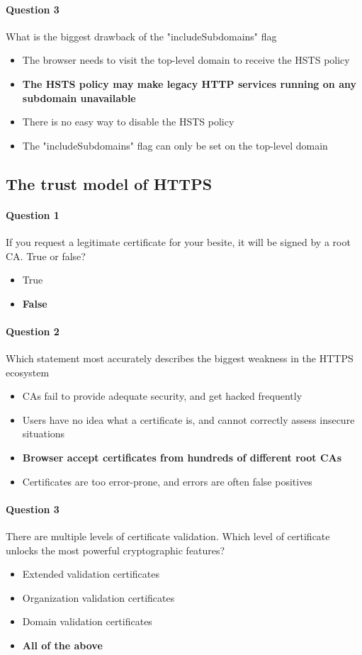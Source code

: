 \documentclass[titlepage]{article}
\begin{document}
    \paragraph{Question 3} What is the biggest drawback of the "includeSubdomains" flag
    \begin{itemize}
        \item The browser needs to visit the top-level domain to receive the HSTS policy
        \item \textbf{The HSTS policy may make legacy HTTP services running on any subdomain unavailable} \checkmark
        \item There is no easy way to disable the HSTS policy
        \item The "includeSubdomains" flag can only be set on the top-level domain
    \end{itemize}
    \subsection{The trust model of HTTPS}
    \paragraph{Question 1} If you request a legitimate certificate for your besite, it will be signed by a root CA. True or false?
    \begin{itemize}
        \item True
        \item \textbf{False} \checkmark
    \end{itemize}
    \paragraph{Question 2} Which statement most accurately describes the biggest weakness in the HTTPS ecosystem
    \begin{itemize}
        \item CAs fail to provide adequate security, and get hacked frequently
        \item Users have no idea what a certificate is, and cannot correctly assess insecure situations
        \item \textbf{Browser accept certificates from hundreds of different root CAs} \checkmark
        \item Certificates are too error-prone, and errors are often false positives
    \end{itemize}
    \paragraph{Question 3} There are multiple levels of certificate validation. Which level of certificate unlocks the most powerful cryptographic features?
    \begin{itemize}
        \item Extended validation certificates
        \item Organization validation certificates
        \item Domain validation certificates
        \item \textbf{All of the above} \checkmark
    \end{itemize}
\end{document}
